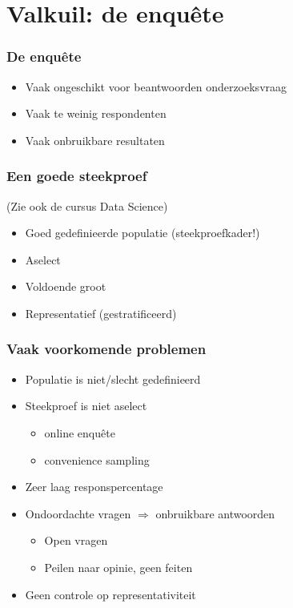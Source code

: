 \documentclass[aspectratio=169]{beamer}
\begin{document}
\section{Valkuil: de enquête}

\begin{frame}
  \frametitle{De enquête}


  \bigskip

  \begin{itemize}
    \item Vaak ongeschikt voor beantwoorden onderzoeksvraag
    \item Vaak te weinig respondenten
    \item Vaak onbruikbare resultaten
  \end{itemize}

\end{frame}

\begin{frame}
  \frametitle{Een goede steekproef}

  (Zie ook de cursus Data Science)

  \medskip

  \begin{itemize}
    \item Goed gedefinieerde populatie (steekproefkader!)
    \item Aselect
    \item Voldoende groot
    \item Representatief (gestratificeerd)
  \end{itemize}

\end{frame}

\begin{frame}
  \frametitle{Vaak voorkomende problemen}

  \begin{itemize}
    \item Populatie is niet/slecht gedefinieerd
    \item Steekproef is niet aselect
          \begin{itemize}
            \item online enquête
            \item convenience sampling
          \end{itemize}
    \item Zeer laag responspercentage
    \item Ondoordachte vragen $\Rightarrow$ onbruikbare antwoorden
          \begin{itemize}
            \item Open vragen
            \item Peilen naar opinie, geen feiten
          \end{itemize}
    \item Geen controle op representativiteit
  \end{itemize}

\end{frame}
\end{document}
